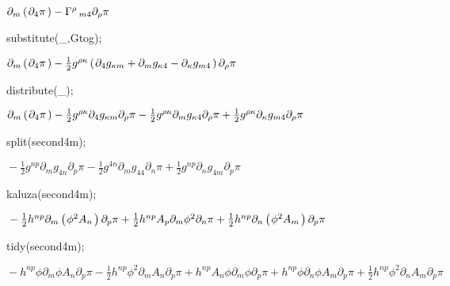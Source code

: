 \documentclass[10pt]{article}
\newcommand\brwrap[3]{%
  \setbox0=\hbox{$#2$}
  \left#1\vbox to \the\ht0{\hbox to 0pt{}}\right.\kern-.2em
  \begingroup #2\endgroup\kern-.15em
  \left.\vbox to \the\ht0{\hbox to 0pt{}}\right#3
}
\begin{document}
\begin{adjustwidth}{1em}{0cm}${}\partial_{m}\brwrap{(}{\partial_{4}{\pi}}{)}-\Gamma^{\rho}\,_{m 4} \partial_{\rho}{\pi}$\end{adjustwidth}
\begin{python}
substitute(_,Gtog);
\end{python}
\begin{adjustwidth}{1em}{0cm}${}\partial_{m}\brwrap{(}{\partial_{4}{\pi}}{)} - \frac{1}{2}g^{\rho \kappa} \brwrap{(}{\partial_{4}{g_{\kappa m}}+\partial_{m}{g_{\kappa 4}}-\partial_{\kappa}{g_{m 4}}}{)} \partial_{\rho}{\pi}$\end{adjustwidth}
\begin{python}
distribute(_);
\end{python}
\begin{adjustwidth}{1em}{0cm}${}\partial_{m}\brwrap{(}{\partial_{4}{\pi}}{)} - \frac{1}{2}g^{\rho \kappa} \partial_{4}{g_{\kappa m}} \partial_{\rho}{\pi} - \frac{1}{2}g^{\rho \kappa} \partial_{m}{g_{\kappa 4}} \partial_{\rho}{\pi}+\frac{1}{2}g^{\rho \kappa} \partial_{\kappa}{g_{m 4}} \partial_{\rho}{\pi}$\end{adjustwidth}
\begin{python}
split(second4m);
\end{python}
\begin{adjustwidth}{1em}{0cm}${} - \frac{1}{2}g^{n p} \partial_{m}{g_{4 n}} \partial_{p}{\pi} - \frac{1}{2}g^{4 n} \partial_{m}{g_{4 4}} \partial_{n}{\pi}+\frac{1}{2}g^{n p} \partial_{n}{g_{4 m}} \partial_{p}{\pi}$\end{adjustwidth}
\begin{python}
kaluza(second4m);
\end{python}
\begin{adjustwidth}{1em}{0cm}${} - \frac{1}{2}h^{n p} \partial_{m}\brwrap{(}{{\phi}^{2} A_{n}}{)} \partial_{p}{\pi}+\frac{1}{2}h^{n p} A_{p} \partial_{m}{{\phi}^{2}} \partial_{n}{\pi}+\frac{1}{2}h^{n p} \partial_{n}\brwrap{(}{{\phi}^{2} A_{m}}{)} \partial_{p}{\pi}$\end{adjustwidth}
\begin{python}
tidy(second4m);
\end{python}
\begin{adjustwidth}{1em}{0cm}${}-h^{n p} \phi \partial_{m}{\phi} A_{n} \partial_{p}{\pi} - \frac{1}{2}h^{n p} {\phi}^{2} \partial_{m}{A_{n}} \partial_{p}{\pi}+h^{n p} A_{n} \phi \partial_{m}{\phi} \partial_{p}{\pi}+h^{n p} \phi \partial_{n}{\phi} A_{m} \partial_{p}{\pi}+\frac{1}{2}h^{n p} {\phi}^{2} \partial_{n}{A_{m}} \partial_{p}{\pi}$\end{adjustwidth}
\end{document}
